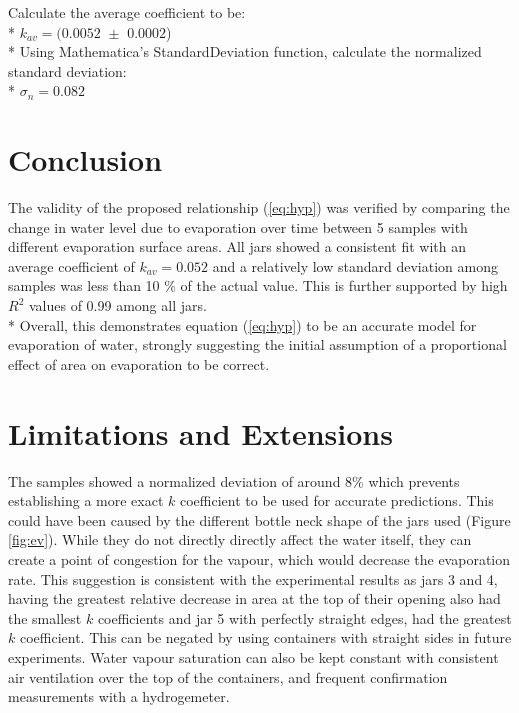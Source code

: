 \documentclass[12pt,letterpaper,final]{report}
\begin{document}
\noindent Calculate the average coefficient to be:
\medskip
\\* $k_{av} = (0.0052 \,\, \pm \,\, 0.0002 $) 
\medskip
\\* Using Mathematica's StandardDeviation function, calculate the normalized standard deviation:
\medskip
\\* $\displaystyle \sigma_{n} = 0.082$ 

\section{Conclusion}
The validity of the proposed relationship (\ref{eq:hyp}) was verified by comparing the change in water level due to evaporation over time between 5 samples with different evaporation surface areas. All jars showed a consistent fit with an average coefficient of $k_{av}=0.052$ and a relatively low standard deviation among samples was less than 10 \% of the actual value. This is further supported by high $R^{2}$ values of 0.99 among all jars.
\medskip
\\* Overall, this demonstrates equation (\ref{eq:hyp}) to be an accurate model for evaporation of water, strongly suggesting the initial assumption of a proportional effect of area on evaporation to be correct.


\section{Limitations and Extensions}
The samples showed a normalized deviation of around 8\% which prevents establishing a more exact $k$ coefficient to be used for accurate predictions. This could have been caused by the different bottle neck shape of the jars used (Figure \ref{fig:ev}). While they do not directly directly affect the water itself, they can create a point of congestion for the vapour, which would decrease the evaporation rate. This suggestion is consistent with the experimental results as jars 3 and 4, having the greatest relative decrease in area at the top of their opening also had the smallest $k$ coefficients and jar 5 with perfectly straight edges, had the greatest $k$ coefficient. This can be negated by using containers with straight sides in future experiments. Water vapour saturation can also be kept constant with consistent air ventilation over the top of the containers, and frequent confirmation measurements with a hydrogemeter.

\printbibliography[heading=subbibliography, title= Bibliography]
\end{document}

